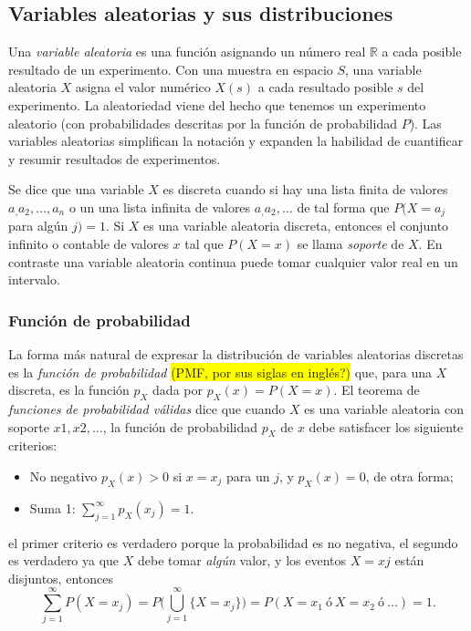 \documentclass[letterpaper]{article}
\begin{document}
\subsection {Variables aleatorias y sus distribuciones}
Una \emph{variable aleatoria} es una función asignando un número real $\mathbb{R}$ a cada posible resultado de un experimento. Con una muestra en espacio $S$, una variable aleatoria $X$ asigna el valor numérico $X(s)$ a cada resultado posible $s$ del experimento. La aleatoriedad viene del hecho que tenemos un experimento aleatorio (con probabilidades descritas por la función de probabilidad $P$). Las variables aleatorias simplifican la notación y expanden la habilidad de cuantificar y resumir resultados de experimentos.

Se dice que una variable $X$ es discreta cuando si hay una lista finita de valores $a_,a_2,\ldots,a_n$ o un una lista infinita de valores $a_,a_2,\ldots$ de tal forma que $P(X=a_j$ para algún $j)=1$. Si $X$ es una variable aleatoria discreta, entonces el conjunto infinito o contable de valores $x$ tal que $P(X=x)$ se llama \emph{soporte} de $X$. En contraste una variable aleatoria continua puede tomar cualquier valor real en un intervalo.
\subsubsection {Función de probabilidad}
La forma más natural de expresar la distribución de variables aleatorias discretas es la \emph{función de probabilidad}\cite{blitz19} \colorbox{yellow}{(PMF, por sus siglas en inglés?)} que, para una $X$ discreta, es la función $p_X$ dada por $p_X(x)=P(X=x)$. El teorema de \emph{funciones de probabilidad válidas} dice que cuando $X$ es una variable aleatoria con soporte $x1,x2,\ldots$, la función de probabilidad $p_X$ de $x$ debe satisfacer los siguiente criterios:
\begin{itemize}
    \item No negativo $p_X (x) > 0$ si $x=x_j$ para un $j$, y $p_X(x)=0$, de otra forma;
    \item Suma 1: $\sum_{j=1}^{\infty}p_X(x_j)=1$.
\end{itemize}
el primer criterio es verdadero porque la probabilidad es no negativa, el segundo es verdadero ya que $X$ debe tomar \emph{algún} valor, y los eventos ${X=xj}$ están disjuntos, entonces
\begin{equation}
\sum_{j=1}^{\infty}P(X=x_j)=P\bigg(\bigcup_{j=1}^{\infty}\{X=x_j\}\bigg)=P(X=x_1\ \text{ó}\ X=x_2\ \text{ó}\ \ldots)=1.
\end{equation}
\end{document}
